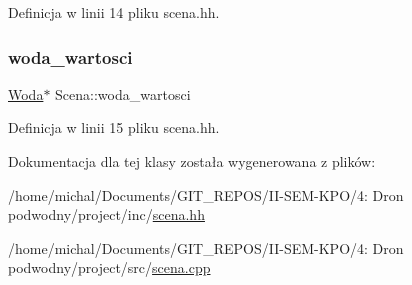 Definicja w linii 14 pliku scena.\+hh.

\mbox{\label{class_scena_ad2f6b4af02a7c8f10dabb005aae33f73}} 
\subsubsection{\texorpdfstring{woda\+\_\+wartosci}{woda\_wartosci}}
{\footnotesize\ttfamily \hyperlink{class_woda}{Woda}$\ast$ Scena\+::woda\+\_\+wartosci\hspace{0.3cm}{\ttfamily [private]}}



Definicja w linii 15 pliku scena.\+hh.



Dokumentacja dla tej klasy została wygenerowana z plików\+:\begin{DoxyCompactItemize}
\item 
/home/michal/\+Documents/\+G\+I\+T\+\_\+\+R\+E\+P\+O\+S/\+I\+I-\/\+S\+E\+M-\/\+K\+P\+O/4\+: Dron podwodny/project/inc/\hyperlink{scena_8hh}{scena.\+hh}\item 
/home/michal/\+Documents/\+G\+I\+T\+\_\+\+R\+E\+P\+O\+S/\+I\+I-\/\+S\+E\+M-\/\+K\+P\+O/4\+: Dron podwodny/project/src/\hyperlink{scena_8cpp}{scena.\+cpp}\end{DoxyCompactItemize}
